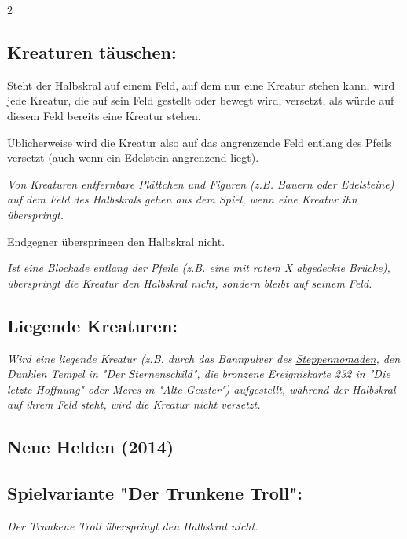 \documentclass[10pt, a4paper, oneside]{book}
\newcommand{\fan}[1]{\textit{#1}}
\begin{document}
\begin{multicols*}{2}
\begin{nobgcolor}
\subsection{Kreaturen täuschen:}


Steht der Halbskral auf einem Feld, auf dem nur eine Kreatur stehen kann, wird jede Kreatur, die auf sein Feld gestellt\supercite{dh-begleitheft} oder bewegt wird, versetzt, als würde auf diesem Feld bereits eine Kreatur stehen.

Üblicherweise wird die Kreatur also auf das angrenzende Feld entlang des Pfeils versetzt (auch wenn ein Edelstein angrenzend liegt). 
\supercite{130318}

\fan{Von Kreaturen entfernbare Plättchen und Figuren (z.B. Bauern oder Edelsteine) auf dem Feld des Halbskrals gehen aus dem Spiel, wenn eine Kreatur ihn überspringt.}

Endgegner überspringen den Halbskral nicht.\supercite{dz-begleitheft}

\fan{Ist eine Blockade entlang der Pfeile (z.B. eine mit rotem X abgedeckte Brücke), überspringt die Kreatur den Halbskral nicht, sondern bleibt auf seinem Feld.}



\subsection{Liegende Kreaturen:}

\fan{Wird eine liegende Kreatur (z.B. durch das Bannpulver des \hyperref[steppennomade]{Steppennomaden}, den Dunklen Tempel in "Der Sternenschild", die bronzene Ereigniskarte 232 in "Die letzte Hoffnung" oder Meres in "Alte Geister") aufgestellt, während der Halbskral auf ihrem Feld steht, wird die Kreatur nicht versetzt.}


\end{nobgcolor}





\begin{nobgcolor}
\section{Neue Helden (2014)}

\subsection{Spielvariante "Der Trunkene Troll":}

\fan{Der Trunkene Troll überspringt den Halbskral nicht.}


\end{nobgcolor}
\end{multicols*}
\end{document}
